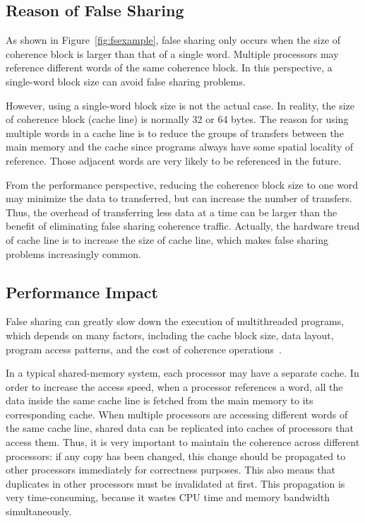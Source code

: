 
\subsection{Reason of False Sharing}

As shown in Figure~\ref{fig:fsexample}, false sharing only occurs when the size of coherence block is larger than that of a single word. Multiple processors may reference different words of the same coherence block. In this perspective, a single-word block size can avoid false sharing problems. 

However, using a single-word block size is not the actual case. In reality, the size of coherence block (cache line) is normally 32 or 64 bytes. The reason for using multiple words in a cache line is to reduce the groups of transfers between the main memory and the cache since programs always have some spatial locality of reference. Those adjacent words are very likely to be referenced in the future.

From the performance perspective, reducing the coherence block size to one word may minimize the data to transferred, but can increase the number of transfers. Thus, the overhead of transferring less data at a time can be larger than the benefit of eliminating false sharing coherence traffic. Actually, the hardware trend of cache line is to increase the size of cache line, which makes false sharing problems increasingly common. 

\subsection{Performance Impact}
\label{falsesharing}
False sharing can greatly slow down the execution of multithreaded programs, which depends on many factors, including the cache block size, data layout, program access patterns, and the cost of coherence operations~\cite{Bolosky:1993:FSE:1295480.1295483}. 

In a typical shared-memory system, each processor may have a separate cache. In order to increase the access speed, when a processor references a word, all the data inside the same cache line is fetched from the main memory to its corresponding cache. 
When multiple processors are accessing different words of the same cache line, shared data can be replicated into caches of processors that access them. Thus, it is very important to maintain the coherence across different processors: if any copy has been changed, this change should be propagated to other processors immediately for correctness purposes. This also means that duplicates in other processors must be invalidated at first. This propagation is very time-consuming, because it wastes CPU time and memory bandwidth simultaneously. 

